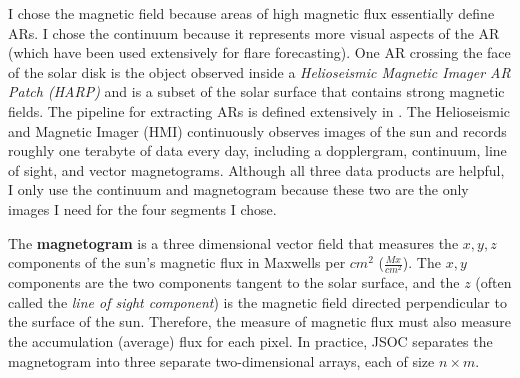 \documentclass[defaultstyle,11pt]{thesis}
\begin{document}
I chose the magnetic field because areas of high magnetic flux essentially define ARs. I chose the continuum because it represents more visual aspects of the AR (which have been used extensively for flare forecasting). One AR crossing the face of the solar disk is the object observed inside a \textit{Helioseismic Magnetic Imager AR Patch (HARP)} \cite{HARP} and is a subset of the solar surface that contains strong magnetic fields. The pipeline for extracting ARs is defined extensively in \cite{SHARP_Pipeline}. The Helioseismic and Magnetic Imager (HMI) continuously observes images of the sun and records roughly one terabyte of data every day, including a dopplergram, continuum, line of sight, and vector magnetograms. Although all three data products are helpful, I only use the continuum and magnetogram because these two are the only images I need for the four segments I chose.

The \textbf{magnetogram} is a three dimensional vector field that measures the $x, y, z$ components of the sun's magnetic flux in Maxwells per $cm^2$ ($\frac{Mx}{cm^2}$). The $x, y$ components are the two components tangent to the solar surface, and the $z$ (often called the \textit{line of sight component}) is the magnetic field directed perpendicular to the surface of the sun. Therefore, the measure of magnetic flux must also measure the accumulation (average) flux for each pixel. In practice, JSOC separates the magnetogram into three separate two-dimensional arrays, each of size $n \times m$. 
\end{document}
